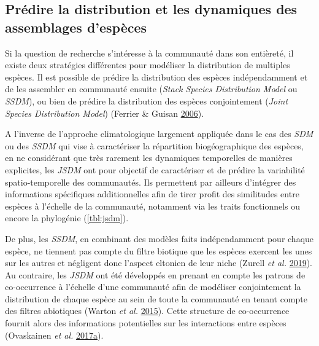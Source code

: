 \documentclass[12pt,]{article}
\begin{document}
\hypertarget{pruxe9dire-la-distribution-et-les-dynamiques-des-assemblages-despuxe8ces}{%
\subsection{Prédire la distribution et les dynamiques des assemblages
d'espèces}\label{pruxe9dire-la-distribution-et-les-dynamiques-des-assemblages-despuxe8ces}}

Si la question de recherche s'intéresse à la communauté dans son
entièreté, il existe deux stratégies différentes pour modéliser la
distribution de multiples espèces. Il est possible de prédire la
distribution des espèces indépendamment et de les assembler en
communauté ensuite (\emph{Stack Species Distribution Model} ou
\emph{SSDM}), ou bien de prédire la distribution des espèces
conjointement (\emph{Joint Species Distribution Model}) (Ferrier \&
Guisan \protect\hyperlink{ref-Ferrier_2006}{2006}).

A l'inverse de l'approche climatologique largement appliquée dans le cas
des \emph{SDM} ou des \emph{SSDM} qui vise à caractériser la répartition
biogéographique des espèces, en ne considérant que très rarement les
dynamiques temporelles de manières explicites, les \emph{JSDM} ont pour
objectif de caractériser et de prédire la variabilité spatio-temporelle
des communautés. Ils permettent par ailleurs d'intégrer des informations
spécifiques additionnelles afin de tirer profit des similitudes entre
espèces à l'échelle de la communauté, notamment via les traits
fonctionnels ou encore la phylogénie (\cref{tbl:jsdm}).

De plus, les \emph{SSDM}, en combinant des modèles faits indépendamment
pour chaque espèce, ne tiennent pas compte du filtre biotique que les
espèces exercent les unes sur les autres et négligent donc l'aspect
eltonien de leur niche (Zurell \emph{et al.}
\protect\hyperlink{ref-Zurell_2019}{2019}). Au contraire, les
\emph{JSDM} ont été développés en prenant en compte les patrons de
co-occurrence à l'échelle d'une communauté afin de modéliser
conjointement la distribution de chaque espèce au sein de toute la
communauté en tenant compte des filtres abiotiques (Warton \emph{et al.}
\protect\hyperlink{ref-warton2015}{2015}). Cette structure de
co-occurrence fournit alors des informations potentielles sur les
interactions entre espèces (Ovaskainen \emph{et al.}
\protect\hyperlink{ref-Ovaskainen_2017b}{2017}\protect\hyperlink{ref-Ovaskainen_2017b}{a}).
\end{document}
